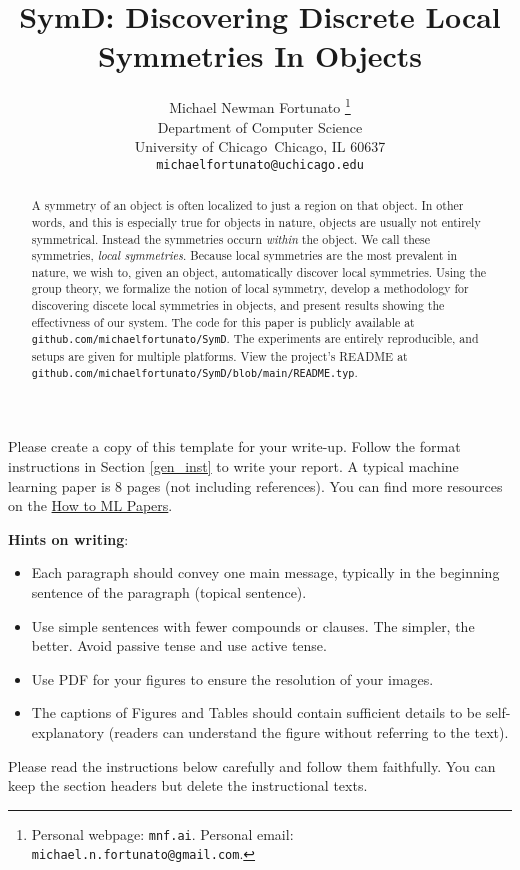 \documentclass{article}
\title{SymD: Discovering Discrete Local Symmetries In Objects}
\author{%
  Michael Newman Fortunato \thanks{Personal webpage:
    \texttt{mnf.ai}. Personal email:
    \texttt{michael.n.fortunato@gmail.com}.
  } \\
  Department of Computer Science\\
  University of Chicago\
  Chicago, IL 60637\\
  \texttt{michaelfortunato@uchicago.edu} \\
}
\begin{document}
\maketitle

\begin{abstract}
  A symmetry of an object is often localized to just a region on that object.
  In other words, and this is especially true for objects in nature,
  objects are usually not entirely symmetrical. Instead the symmetries occurn
  \textit{within} the object. We call these symmetries,
  \textit{local symmetries}. Because local symmetries are the most prevalent
  in nature, we wish to, given an object, automatically discover
  local symmetries. Using the group theory, we formalize the notion of local
  symmetry, develop a methodology for discovering discete local symmetries in
  objects, and present results showing the effectivness of our system.
  The code for this paper is publicly available at
  \texttt{github.com/michaelfortunato/SymD}.
  The experiments are entirely reproducible, and setups are given for multiple
  platforms. View the project's README at
  \texttt{github.com/michaelfortunato/SymD/blob/main/README.typ}.
\end{abstract}
\noindent Please create a copy of this template for your write-up.
Follow the format instructions in Section \ref{gen_inst} to write
your report. A typical machine learning paper is 8 pages (not
including references). You can find more resources on the
\href{https://docs.google.com/document/d/16R1E2ExKUCP5SlXWHr-KzbVDx9DBUclra-EbU8IB-iE/edit#heading=h.16t67gkeu9dx}{How
to ML Papers}.

\textbf{Hints on writing}:
\begin{itemize}
  \item Each paragraph should convey one main message, typically in
    the beginning sentence of the paragraph (topical sentence).
  \item  Use simple sentences with fewer compounds or clauses. The
    simpler, the better. Avoid passive tense and use active tense.
  \item Use PDF for your figures to ensure the resolution of your images.
  \item The captions of Figures and Tables should contain sufficient
    details to be self-explanatory (readers can understand the
    figure without referring to the text).
\end{itemize}
Please read the instructions below carefully and follow them
faithfully. You can keep the section headers but delete the
instructional texts.
\end{document}
